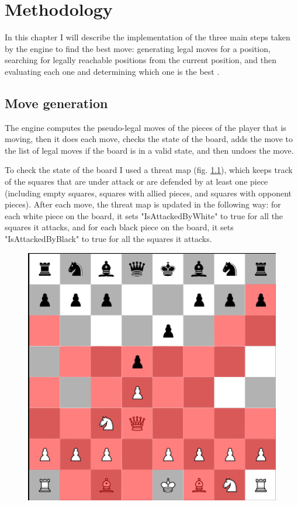 \chapter{Methodology}
\label{chap:ch4}

In this chapter I will describe the implementation of the three main steps taken by the engine to find the best move: generating legal moves for a position, searching for legally reachable positions from the current position, and then evaluating each one and determining which one is the best \cite{marsland1986review}.


\section{Move generation}
\label{sec:ch4sec1}

The engine computes the pseudo-legal moves of the pieces of the player that is moving, then it does each move, checks the state of the board, adds the move to the list of legal moves if the board is in a valid state, and then undoes the move.

To check the state of the board I used a threat map (fig. \ref{fig:threatMap}), which keeps track of the squares that are under attack or are defended by at least one piece (including empty squares, squares with allied pieces, and squares with opponent pieces). After each move, the threat map is updated in the following way: for each white piece on the board, it sets "IsAttackedByWhite" to true for all the squares it attacks, and for each black piece on the board, it sets "IsAttackedByBlack" to true for all the squares it attacks.

\begin{figure}
  \centering
  \includegraphics[scale=0.5]{figures/white-threat-map.png}
  \label{fig:threatMap}
\end{figure}

